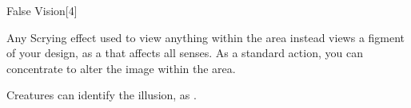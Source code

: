 \begin{spellsection}{False Vision}[4]
    \begin{spellheader}
    \end{spellheader}
    \begin{spellcontent}
        \begin{spelltargetinginfo}
        \end{spelltargetinginfo}
        \begin{spelleffects}
            \spelleffect Any Scrying effect used to view anything within the area instead views a figment of your design, as a  that affects all senses. As a standard action, you can concentrate to alter the image within the area.
            \spelldur \durext \dismissable
        \end{spelleffects}
    \end{spellcontent}
    \begin{spellfooter}
        \spellnotes Creatures can identify the illusion, as .
    \end{spellfooter}
    \begin{spellaugments}
    \end{spellaugments}
\end{spellsection}

